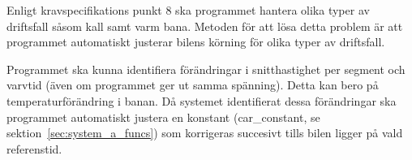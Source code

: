 Enligt kravspecifikations punkt 8 ska programmet hantera olika typer av
driftsfall såsom kall samt varm bana. Metoden för att lösa detta problem är att
programmet automatiskt justerar bilens körning för olika typer av driftsfall. 


Programmet ska kunna identifiera förändringar i snitthastighet per segment och
varvtid (även om programmet ger ut samma spänning). Detta kan bero på
temperaturförändring i banan. Då systemet identifierat dessa förändringar ska
programmet automatiskt justera en konstant (car\_constant, se
sektion~\ref{sec:system_a_funcs}) som korrigeras succesivt tills bilen ligger
på vald referenstid. 

